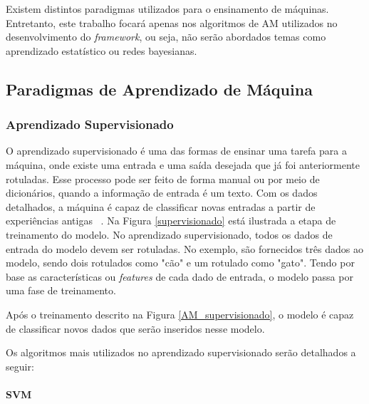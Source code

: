 Existem distintos paradigmas utilizados para o ensinamento de máquinas. 
Entretanto, este trabalho focará apenas nos algoritmos de \acrshort{AM} utilizados no desenvolvimento do \textit{framework}, ou seja, 
não serão abordados temas como aprendizado estatístico ou redes bayesianas.

  \subsection{Paradigmas de Aprendizado de Máquina}


    \subsubsection{Aprendizado Supervisionado}

      O aprendizado supervisionado é uma das formas de ensinar uma tarefa para a máquina, onde existe uma entrada e uma saída desejada que já foi 
      anteriormente rotuladas. Esse processo pode ser feito de forma manual ou por meio de dicionários, quando a informação de entrada é um texto.
      Com os dados detalhados, a máquina é capaz de classificar novas entradas a partir de experiências antigas ~\cite{mitchell}. Na Figura \ref{supervisionado}  está ilustrada
       a etapa de treinamento do modelo. No aprendizado supervisionado, todos os dados de entrada do modelo devem ser rotuladas. 
       No exemplo, são fornecidos três dados ao modelo, sendo dois rotulados como "cão" e um rotulado como "gato". Tendo por base as 
       características ou \textit{features} de cada dado de entrada, o modelo passa por uma fase de treinamento.
      




      Após o treinamento descrito na Figura \ref{AM_supervisionado}, o modelo é capaz de classificar novos dados que serão inseridos
      nesse modelo.



      Os algoritmos mais utilizados no aprendizado supervisionado serão detalhados a seguir:

      \paragraph{SVM}
      \label{par:svm}

